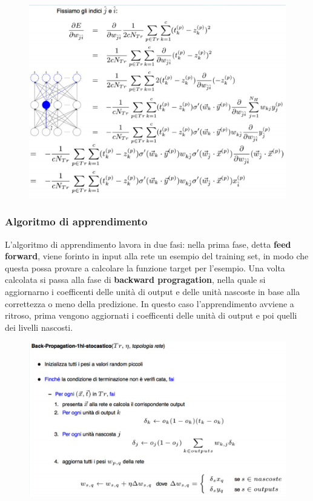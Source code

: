\begin{figure}[htbp]
\centering
\includegraphics{./notes/immagini/l10-rete-input.png}
\caption{}
\end{figure}

\subsubsection{Algoritmo di
apprendimento}\label{algoritmo-di-apprendimento-1}

L'algoritmo di apprendimento lavora in due fasi: nella prima fase, detta
\textbf{feed forward}, viene forinto in input alla rete un esempio del
training set, in modo che questa possa provare a calcolare la funzione
target per l'esempio. Una volta calcolata si passa alla fase di
\textbf{backward progragation}, nella quale si aggiornarno i coefficenti
delle unità di output e delle unità nascoste in base alla correttezza o
meno della predizione. In questo caso l'apprendimento avviene a ritroso,
prima vengono aggiornati i coefficenti delle unità di output e poi
quelli dei livelli nascosti.

\begin{figure}[htbp]
\centering
\includegraphics{./notes/immagini/l10-apprendimento-rete.png}
\caption{}
\end{figure}

